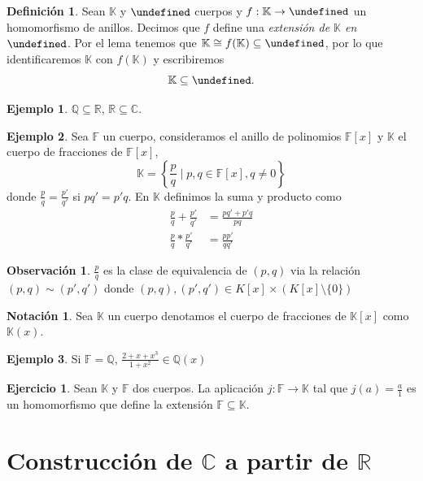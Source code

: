 \documentclass[10pt, spanish]{report}
\theoremstyle{definition}
\newtheorem*{defin}{Definición}
\newtheorem*{notacion}{Notación}
\newtheorem*{ej}{Ejemplo}
\newtheorem*{ejer}{Ejercicio}
\newtheorem*{obs}{Observación}
\newcommand{\Q}{\mathbb{Q}}
\newcommand{\R}{\mathbb{R}}
\newcommand{\C}{\mathbb{C}}
\newcommand{\F}{\mathbb{F}}
\newcommand{\K}{\mathbb{K}}
\let\L\undefined
\newcommand{\L}{\mathbb{L}}
\newcommand{\fecha}[1]{\marginpar{\underline{#1}}}
\begin{document}
\begin{defin}
    Sean $\K$ y $\L$ cuerpos y $f:\K\to\L$ un homomorfismo de anillos. Decimos
    que $f$ define una \textit{extensión de $\K$ en $\L$}.
    Por el lema tenemos que $\K\cong f(\K)\subseteq \L$, por lo que identificaremos
    $\K$ con $f(\K)$ y escribiremos \[\K\subseteq \L.\]
\end{defin}

\begin{ej}
    $\Q\subseteq\R$, $\R\subseteq\C$.
\end{ej}

\fecha{16/02}

\begin{ej}
    Sea $\F$ un cuerpo, consideramos el anillo de polinomios $\F[x]$ y
    $\K$ el cuerpo de fracciones de $\F[x]$,
    \[\K=\left\{ \frac{p}{q}\mid p,q\in \F[x], q\neq 0 \right\}\]
    donde $\frac{p}{q} = \frac{p'}{q'}$ si $pq'=p'q$.
    En $\K$ definimos la suma y producto como
    \begin{align*}
        \frac{p}{q}+\frac{p'}{q'}&=\frac{pq'+p'q}{pq}\\
        \frac{p}{q}*\frac{p'}{q'}&=\frac{pp'}{qq'}
    \end{align*}
\end{ej}

\begin{obs}
    $\frac{p}{q}$ es la clase de equivalencia de $(p,q)$ via la relación
    $(p,q)\sim(p',q')$ donde $(p,q),(p',q')\in K[x]\times(K[x]\setminus\{0\})$
\end{obs}

\begin{notacion}
    Sea $\K$ un cuerpo denotamos el cuerpo de fracciones de $\K[x]$ como $\K(x)$.
\end{notacion}

\begin{ej}
    Si $\F=\Q$, $\frac{2+x+x^3}{1+x^2}\in \Q(x)$
\end{ej}

\begin{ejer}
    Sean $\K$ y $\F$ dos cuerpos. La aplicación $j:\F\to\K$ tal que $j(a)=
    \frac{a}{1}$ es un homomorfismo que define la extensión $\F\subseteq \K$.
\end{ejer}


\section{Construcción de $\C$ a partir de $\R$}
\end{document}
